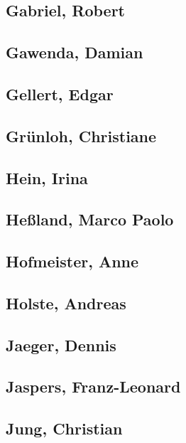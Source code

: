 \subsection{Gabriel, Robert}\label{gabriel-robert}

\subsection{Gawenda, Damian}\label{gawenda-damian}

\subsection{Gellert, Edgar}\label{gellert-edgar}

\subsection{Grünloh, Christiane}\label{gruxfcnloh-christiane}

\subsection{Hein, Irina}\label{hein-irina}

\subsection{Heßland, Marco Paolo}\label{heuxdfland-marco-paolo}

\subsection{Hofmeister, Anne}\label{hofmeister-anne}

\subsection{Holste, Andreas}\label{holste-andreas}

\subsection{Jaeger, Dennis}\label{jaeger-dennis}

\subsection{Jaspers, Franz-Leonard}\label{jaspers-franz-leonard}

\subsection{Jung, Christian}\label{jung-christian}

